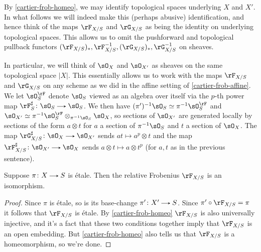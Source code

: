 \begin{nothing}
  \label{cartier-frob-identify}
  By \cref{cartier-frob-homeo}, we may identify topological spaces underlying $X$ and $X'$. In what follows we will indeed make this (perhaps abusive) identification, and hence think of the maps $\rF_{X/S}$ and $\rG_{X/S}$ as being the identity on underlying topological spaces. This allows us to omit the pushforward and topological pullback functors $(\rF_{X/S})_*, \rF_{X/S}^{-1}, (\rG_{X/S})_*, \rG_{X/S}^{-1}$ on sheaves.

  In particular, we will think of $\sO_X$ and $\sO_{X'}$ as sheaves on the same topological space $|X|$. This essentially allows us to work with the maps $\rF_{X/S}$ and $\rG_{X/S}$ on any scheme as we did in the affine setting of \cref{cartier-frob-affine}. We let $\sO_S^\rF$ denote $\sO_S$ viewed as an algebra over itself via the $p$-th power map $\rF_S^\sharp \c \sO_S \to \sO_S$. We then have $(\pi')^{-1}\sO_S \iso \pi^{-1}\sO_S^\rF$ and $\sO_{X'} \iso \pi^{-1}\sO_S^\rF \otimes_{\pi^{-1}\sO_S} \sO_X$, so sections of $\sO_{X'}$ are generated locally by sections of the form $a \otimes t$ for $a$ a section of $\pi^{-1}\sO_S$ and $t$ a section of $\sO_X$. The map $\rG_{X/S}^\sharp \c \sO_X \to \sO_{X'}$ sends $at \mapsto a^p \otimes t$ and the map $\rF_{X/S}^\sharp \c \sO_{X'} \to \sO_X$ sends $a \otimes t \mapsto a \otimes t^p$ (for $a,t$ as in the previous sentence).
\end{nothing}

\begin{lemma}
  \label{cartier-frob-etale}
  Suppose $\pi \c X \to S$ is \'etale. Then the relative Frobenius $\rF_{X/S}$ is an isomorphism.

  \begin{proof}
    Since $\pi$ is \'etale, so is its base-change $\pi' \c X' \to S$. Since $\pi' \circ \rF_{X/S} = \pi$ it follows that $\rF_{X/S}$ is \'etale. By \cref{cartier-frob-homeo} $\rF_{X/S}$ is also universally injective, and it's a fact that these two conditions together imply that $\rF_{X/S}$ is an open embedding. But \cref{cartier-frob-homeo} also tells us that $\rF_{X/S}$ is a homeomorphism, so we're done.
  \end{proof}
\end{lemma}

